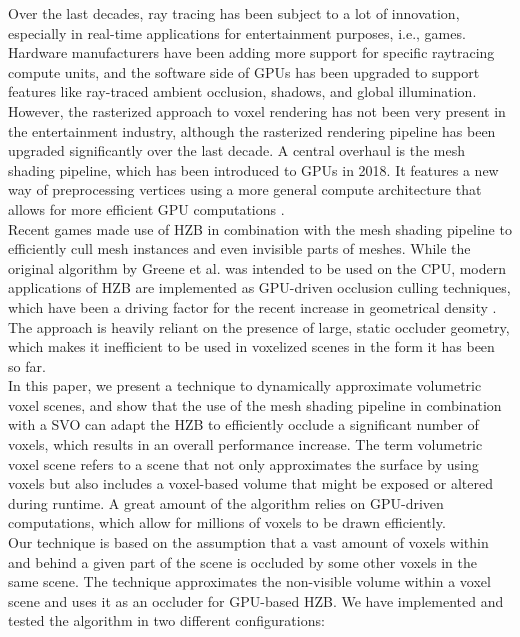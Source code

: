 \documentclass[conference]{IEEEtran}
\begin{document}
\noindent
Over the last decades, ray tracing has been subject to a lot of innovation, especially in  
real-time applications for entertainment purposes, i.e., games. Hardware manufacturers have 
been adding more support for specific raytracing compute units, and the software side of 
\ac{GPU}s has been upgraded to support features like ray-traced ambient occlusion, shadows, 
and global illumination. However, the rasterized approach to voxel rendering  has not been 
very present in the entertainment industry, although the rasterized rendering pipeline has 
been upgraded significantly over the last decade. A central overhaul is the mesh shading 
pipeline, which has been introduced to \ac{GPU}s in 2018. It features a new way of preprocessing 
vertices using a more general compute architecture that allows for more efficient \ac{GPU} 
computations \cite{b11}. \\

\noindent
Recent games made use of \ac{HZB} in combination with the mesh shading pipeline to efficiently 
cull mesh instances and even invisible parts of meshes. While the original algorithm by Greene 
et al. \cite{b1} was intended to be used on the \ac{CPU}, modern applications of \ac{HZB} are 
implemented as \ac{GPU}-driven occlusion culling techniques, which have been a driving factor 
for the recent increase in geometrical density \cite{b12, b13}. The approach is heavily reliant on the presence 
of large, static occluder geometry, which makes it inefficient to be used in voxelized scenes 
in the form it has been so far. \\

\noindent
In this paper, we present a technique to dynamically approximate volumetric voxel scenes, and 
show that the use of the mesh shading pipeline in combination with a \ac{SVO} can adapt the 
\ac{HZB} to efficiently occlude a significant number of voxels, which results in an overall 
performance increase. The term volumetric voxel scene refers to a scene that not only 
approximates the surface by using voxels but also includes a voxel-based volume that might be 
exposed or altered during runtime. A great amount of the algorithm relies on \ac{GPU}-driven 
computations, which allow for millions of voxels to be drawn efficiently. \\

\noindent
Our technique is based on the assumption that a vast amount of voxels within and behind a given 
part of the scene is occluded by some other voxels in the same scene. The technique approximates 
the non-visible volume within a voxel scene and uses it as an occluder for \ac{GPU}-based \ac{HZB}. 
We have implemented and tested the algorithm in two different configurations:
\end{document}
